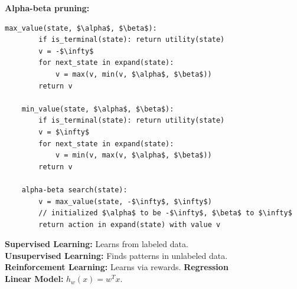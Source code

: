 \documentclass[8pt,twocolumn]{article}
\begin{document}
\textbf{Alpha-beta pruning:}\vspace{-0.6em}
\begin{lstlisting}[mathescape=true]
    max_value(state, $\alpha$, $\beta$):
        if is_terminal(state): return utility(state)
        v = -$\infty$
        for next_state in expand(state):
            v = max(v, min(v, $\alpha$, $\beta$))
        return v
    
    min_value(state, $\alpha$, $\beta$):
        if is_terminal(state): return utility(state)
        v = $\infty$
        for next_state in expand(state):
            v = min(v, max(v, $\alpha$, $\beta$))
        return v

    alpha-beta search(state): 
        v = max_value(state, -$\infty$, $\infty$) 
        // initialized $\alpha$ to be -$\infty$, $\beta$ to $\infty$
        return action in expand(state) with value v
\end{lstlisting}\vspace{-0.6em}
\textbf{Supervised Learning:} Learns from labeled data.\\
\textbf{Unsupervised Learning:} Finds patterns in unlabeled data.\\
\textbf{Reinforcement Learning:} Learns via rewards.
\textbf{Regression}\\
\textbf{Linear Model:} $h_w(x) = w^T x$. \vspace{-0.6em}
\end{document}
